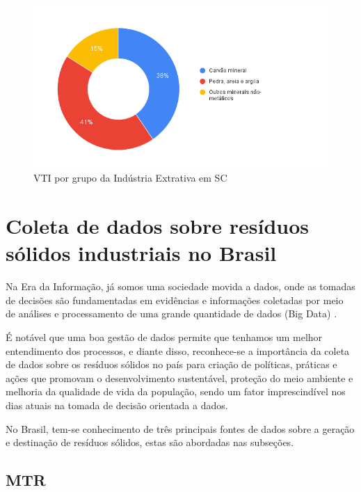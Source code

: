 \begin{figure}[ht]
	\caption{\label{fig:pia_ie} VTI por grupo da Indústria Extrativa em SC}
	\begin{center}
		\includegraphics[scale=0.6]{images/pia-ibge-2021-ie.png}
	\end{center}
\end{figure}

\section{Coleta de dados sobre resíduos sólidos industriais no Brasil}

Na Era da Informação, já somos uma sociedade movida a dados, onde as tomadas de decisões são fundamentadas em evidências e informações coletadas por meio de análises e processamento de uma grande quantidade de dados (Big Data) \cite{castells_information_2010}. 

É notável que uma boa gestão de dados permite que tenhamos um melhor entendimento dos processos, e diante disso, reconhece-se a importância da coleta de dados sobre os resíduos sólidos no país para criação de políticas, práticas e ações que promovam o desenvolvimento sustentável, proteção do meio ambiente e melhoria da qualidade de vida da população, sendo um fator imprescindível nos dias atuais na tomada de decisão orientada a dados.

No Brasil, tem-se conhecimento de três principais fontes de dados sobre a geração e destinação de resíduos sólidos, estas são abordadas nas subseções.
\subsection{MTR}

